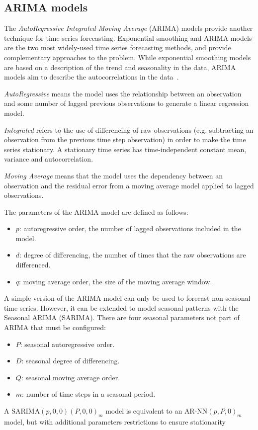 \subsection{ARIMA models}
\label{subsec:arima_models}
The \emph{AutoRegressive Integrated Moving Average} (ARIMA) models provide another technique for time series forecasting. Exponential smoothing and ARIMA models are the two most widely-used time series forecasting methods, and provide complementary approaches to the problem. While exponential smoothing models are based on a description of the trend and seasonality in the data, ARIMA models aim to describe the autocorrelations in the data~\cite{hyndman2018}.

\emph{AutoRegressive} means the model uses the relationship between an observation and some number of lagged previous observations to generate a linear regression model.

\emph{Integrated} refers to the use of differencing of raw observations (e.g. subtracting an observation from the previous time step observation) in order to make the time series stationary. A stationary time series has time-independent constant mean, variance and autocorrelation.

\emph{Moving Average} means that the model uses the dependency between an observation and the residual error from a moving average model applied to lagged observations.

The parameters of the ARIMA model are defined as follows:
\begin{itemize}
  \item \( p \): autoregressive order, the number of lagged observations included in the model.
  \item \( d \): degree of differencing, the number of times that the raw observations are differenced.
  \item \( q \): moving average order, the size of the moving average window.
\end{itemize}

A simple version of the ARIMA model can only be used to forecast non-seasonal time series. However, it can be extended to model seasonal patterns with the Seasonal ARIMA (SARIMA). There are four seasonal parameters not part of ARIMA that must be configured:
\begin{itemize}
  \item \( P \): seasonal autoregressive order.
  \item \( D \): seasonal degree of differencing.
  \item \( Q \): seasonal moving average order.
  \item \( m \): number of time steps in a seasonal period.
\end{itemize}
A \( \text{SARIMA}(p,0,0)(P,0,0)_m \) model is equivalent to an \( \text{AR-NN}(p,P,0)_m \) model, but with additional parameters restrictions to ensure stationarity

